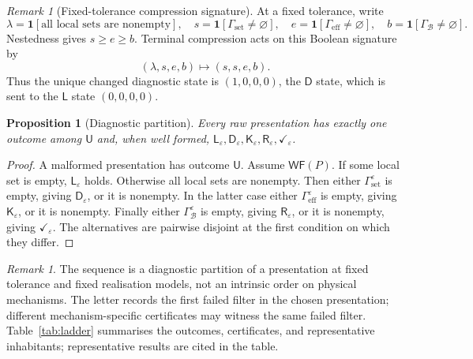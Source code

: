 \documentclass[11pt]{article}
\theoremstyle{plain}
\newtheorem{proposition}[theorem]{Proposition}
\theoremstyle{definition}
\theoremstyle{remark}
\newtheorem{remark}[theorem]{Remark}
\newcommand{\eps}{\varepsilon}
\begin{document}
\begin{remark}[Fixed-tolerance compression signature]
At a fixed tolerance, write
\[
\lambda=\mathbf 1[\text{all local sets are nonempty}],\quad
s=\mathbf 1[\Gamma_{\mathrm{set}}\ne\varnothing],\quad
e=\mathbf 1[\Gamma_{\mathrm{eff}}\ne\varnothing],\quad
b=\mathbf 1[\Gamma_{\mathcal B}\ne\varnothing].
\]
Nestedness gives $s\ge e\ge b$. Terminal compression acts on this Boolean
signature by
\[
(\lambda,s,e,b)\longmapsto(s,s,e,b).
\]
Thus the unique changed diagnostic state is
$(1,0,0,0)$, the $\mathsf D$ state, which is sent to the $\mathsf L$ state
$(0,0,0,0)$.
\end{remark}


\begin{proposition}[Diagnostic partition]\label{prop:diagnostic}
Every raw presentation has exactly one outcome among
$\mathsf U$ and, when well formed,
$\mathsf L_\eps,\mathsf D_\eps,\mathsf K_\eps,
\mathsf R_\eps,\checkmark_\eps$.
\end{proposition}

\begin{proof}
A malformed presentation has outcome $\mathsf U$. Assume $\mathsf{WF}(P)$.
If some local set is empty, $\mathsf L_\eps$ holds. Otherwise all local sets are
nonempty. Then either $\Gamma_{\mathrm{set}}^\eps$ is empty, giving
$\mathsf D_\eps$, or it is nonempty. In the latter case either
$\Gamma_{\mathrm{eff}}^\eps$ is empty, giving $\mathsf K_\eps$, or it is
nonempty. Finally either $\Gamma_{\mathcal B}^\eps$ is empty, giving
$\mathsf R_\eps$, or it is nonempty, giving $\checkmark_\eps$. The alternatives
are pairwise disjoint at the first condition on which they differ.
\end{proof}

\begin{remark}\label{rem:ladder}
The sequence is a diagnostic partition of a presentation at fixed tolerance and
fixed realisation models, not an intrinsic order on physical mechanisms. The
letter records the first failed filter in the chosen presentation; different
mechanism-specific certificates may witness the same failed filter.
Table~\ref{tab:ladder} summarises the outcomes, certificates, and representative inhabitants; representative results are cited in the table.
\end{remark}
\end{document}
